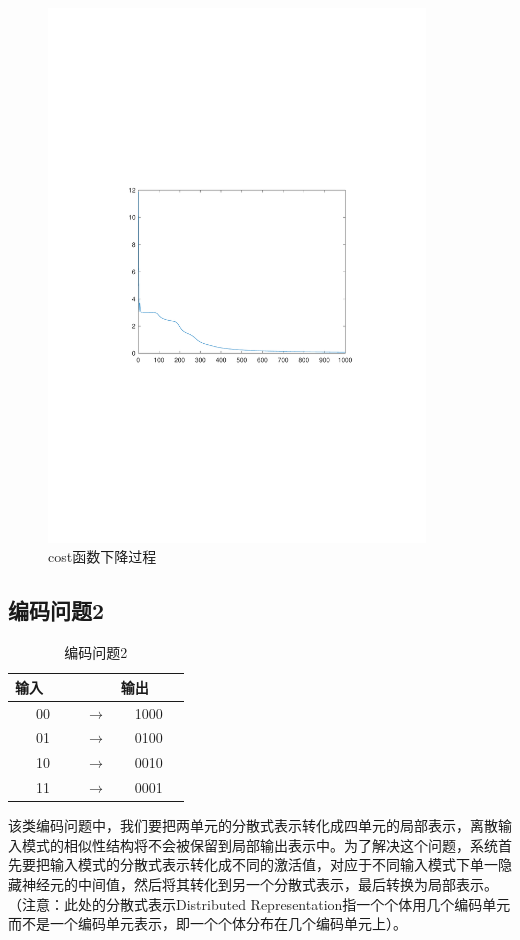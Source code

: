 \begin{figure}[H]
\centering
\includegraphics[width=10cm]{fig/encode1.pdf}
\caption{cost函数下降过程}
\end{figure}

\subsection{编码问题2}
\begin{table}[!tbh]
\caption{\quad 编码问题2}
\centering
\begin{tabular}{c c c}  \hline
\qquad 输入\,\,\,\,\,\,\,\,\,\,\,\, &	&\qquad 输出\,\,\,\,\,\,\,\,\,\,\,\, \\ \hline
00&$\rightarrow$&1000\\
01&$\rightarrow$&0100\\
10&$\rightarrow$&0010\\
11&$\rightarrow$&0001\\\hline
\end{tabular}
\label{Tcode24}
\end{table}

该类编码问题中，我们要把两单元的分散式表示转化成四单元的局部表示，离散输入模式的相似性结构将不会被保留到局部输出表示中。为了解决这个问题，系统首先要把输入模式的分散式表示转化成不同的激活值，对应于不同输入模式下单一隐藏神经元的中间值，然后将其转化到另一个分散式表示，最后转换为局部表示。（注意：此处的分散式表示Distributed Representation指一个个体用几个编码单元而不是一个编码单元表示，即一个个体分布在几个编码单元上）。

